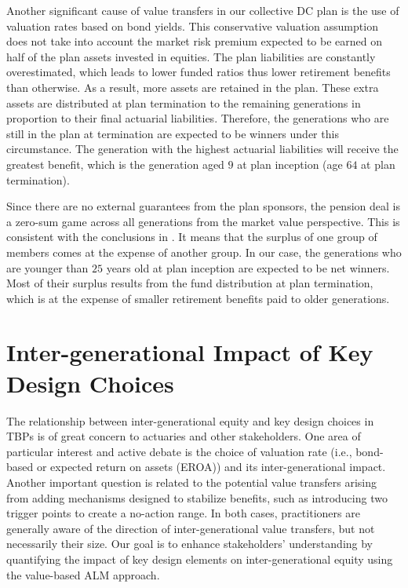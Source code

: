\documentclass{sfuthesis}
\numberwithin{equation}{chapter}
\begin{document}
	
	\justify
	Another significant cause of value transfers in our collective DC plan is the use of valuation rates based on bond yields. This conservative valuation assumption does not take into account the market risk premium expected to be earned on half of the plan assets invested in equities. The plan liabilities are constantly overestimated, which leads to lower funded ratios thus lower retirement benefits than otherwise. As a result, more assets are retained in the plan. These extra assets are distributed at plan termination to the remaining generations in proportion to their final actuarial liabilities. Therefore, the generations who are still in the plan at termination are expected to be winners under this circumstance. The generation with the highest actuarial liabilities will receive the greatest benefit, which is the generation aged $9$ at plan inception (age $64$ at plan termination).
	
	\justify
	Since there are no external guarantees from the plan sponsors, the pension deal is a zero-sum game across all generations from the market value perspective. This is consistent with the conclusions in \citet{Cui2011}. It means that the surplus of one group of members comes at the expense of another group. In our case, the generations who are younger than $25$ years old at plan inception are expected to be net winners. Most of their surplus results from the fund distribution at plan termination, which is at the expense of smaller retirement benefits paid to older generations.
	
	\chapter{Inter-generational Impact of Key Design Choices}
	\label{Comparisons of Different TBP Plan Designs}
	The relationship between inter-generational equity and key design choices in TBPs is of great concern to actuaries and other stakeholders. One area of particular interest and active debate is the choice of valuation rate (i.e., bond-based or expected return on assets (EROA)) and its inter-generational impact. Another important question is related to the potential value transfers arising from adding mechanisms designed to stabilize benefits, such as introducing two trigger points to create a no-action range. In both cases, practitioners are generally aware of the direction of inter-generational value transfers, but not necessarily their size. Our goal is to enhance stakeholders' understanding by quantifying the impact of key design elements on inter-generational equity using the value-based ALM approach. 
	
\end{document}
